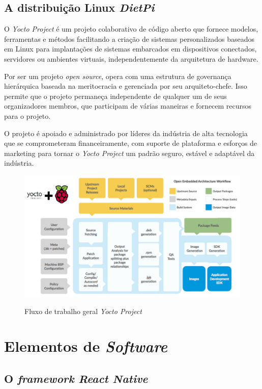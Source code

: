 \subsection{A distribuição Linux \textit{DietPi}}

O \textit{Yocto Project} é um projeto colaborativo de código aberto que fornece modelos, ferramentas e métodos facilitando a criação de sistemas personalizados baseados em Linux para implantações de sistemas embarcados em dispositivos conectados, servidores ou ambientes virtuais, independentemente da arquitetura de hardware.

Por ser um projeto \textit{open source}, opera com uma estrutura de governança hierárquica baseada na meritocracia e gerenciada por seu arquiteto-chefe. Isso permite que o projeto permaneça independente de qualquer um de seus organizadores membros, que participam de várias maneiras e fornecem recursos para o projeto.

O projeto é apoiado e administrado por líderes da indústria de alta tecnologia que se comprometeram financeiramente, com suporte de plataforma e esforços de marketing para tornar o \textit{Yocto Project} um padrão seguro, estável e adaptável da indústria.

\begin{figure}[H]
	\centering
	\caption{Fluxo de trabalho geral \textit{Yocto Project}}
	\includegraphics[width=1.0\textwidth]{figuras/yocto-fluxo.png}
	\label{fig:youcto-fluxo}
\end{figure} 

\section{Elementos de \textit{Software}}
\subsection{O \textit{framework React Native}}

